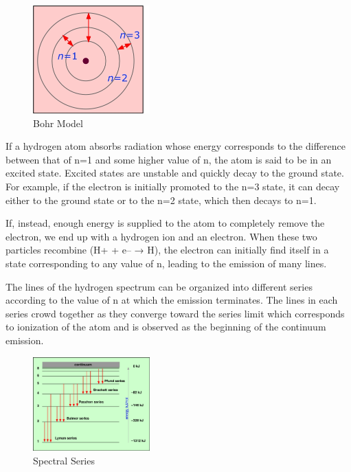 \documentclass{article}
\begin{document}
\begin{figure}[h]
\begin{center}
\includegraphics[width=0.4\textwidth]{BohrModel-2} %
\caption{Bohr Model}
\end{center}
\end{figure}


If a hydrogen atom absorbs radiation whose energy corresponds to the difference between that of n=1 and some higher value of n, the atom is said to be in an excited state. Excited states are unstable and quickly decay to the ground state. For example, if the electron is initially promoted to the n=3 state, it can decay either to the ground state or to the n=2 state, which then decays to n=1.

If, instead, enough energy is supplied to the atom to completely remove the electron, we end up with a hydrogen ion and an electron. When these two particles recombine (H+ + e– → H), the electron can initially find itself in a state corresponding to any value of n, leading to the emission of many lines.

The lines of the hydrogen spectrum can be organized into different series according to the value of n at which the emission terminates. The lines in each series crowd together as they converge toward the series limit which corresponds to ionization of the atom and is observed as the beginning of the continuum emission.

\begin{figure}[h]
\begin{center}
\includegraphics[width=0.4\textwidth]{spectral} %
\caption{Spectral Series}
\end{center}
\end{figure}
\end{document}
